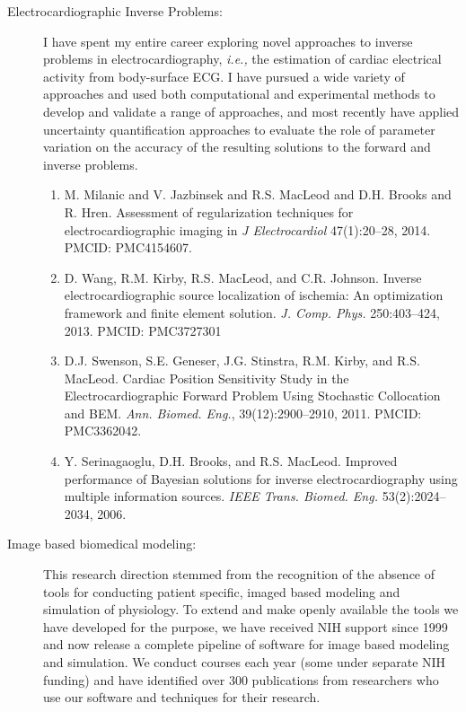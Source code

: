 \documentclass[10pt]{article}
\newcommand{\ie}{{\em i.e.,}}
\begin{document}
\begin{description}
  \item [Electrocardiographic Inverse Problems: ] I have spent my entire
    career exploring novel approaches to inverse problems in
    electrocardiography, \ie{} the estimation of cardiac electrical
    activity from body-surface ECG.  I have pursued a wide variety of
    approaches and used both computational and experimental methods to
    develop and validate a range of approaches, and most recently have
    applied uncertainty quantification approaches to evaluate the role of
    parameter variation on the accuracy of the resulting solutions to the
    forward and inverse problems.
    
    \begin{enumerate}
      \item M. Milanic and V. Jazbinsek and R.S. MacLeod and D.H. Brooks
        and R. Hren. Assessment of regularization techniques for
        electrocardiographic imaging in \emph{J Electrocardiol}
        47(1):20--28, 2014. PMCID: PMC4154607.

      \item D. Wang, R.M. Kirby, R.S. MacLeod, and C.R. Johnson. Inverse
        electrocardiographic source localization of ischemia: An
        optimization framework and finite element
        solution. \emph{J. Comp. Phys.}  250:403--424, 2013.  PMCID:
        PMC3727301

      \item D.J. Swenson, S.E. Geneser, J.G. Stinstra, R.M. Kirby, and
        R.S. MacLeod. Cardiac Position Sensitivity Study in the
        Electrocardiographic Forward Problem Using Stochastic Collocation
        and BEM. \emph{Ann. Biomed. Eng.}, 39(12):2900--2910, 2011. PMCID:
        PMC3362042.

      \item Y. Serinagaoglu, D.H. Brooks, and R.S. MacLeod. Improved
        performance of Bayesian solutions for inverse electrocardiography
        using multiple information sources. \emph{ IEEE
          Trans. Biomed. Eng.} 53(2):2024--2034, 2006.
    \end{enumerate}

  \item [Image based biomedical modeling:] This research direction stemmed
    from the recognition of the absence of tools for conducting patient
    specific, imaged based modeling and simulation of physiology.  To
    extend and make openly available the tools we have developed for the
    purpose, we have received NIH support since 1999 and now release a
    complete pipeline of software for image based modeling and simulation.
    We conduct courses each year (some under separate NIH funding) and have
    identified over 300 publications from researchers who use our software
    and techniques for their research.


\end{description}
\end{document}
